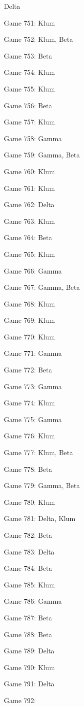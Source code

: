 \documentclass{article}
\begin{document}
\begin{multicols}{3}
\begin{compactitem}
Delta
\item Game 751:
Klum
\item Game 752:
Klum, Beta
\item Game 753:
Beta
\item Game 754:
Klum
\item Game 755:
Klum
\item Game 756:
Beta
\item Game 757:
Klum
\item Game 758:
Gamma
\item Game 759:
Gamma, Beta
\item Game 760:
Klum
\item Game 761:
Klum
\item Game 762:
Delta
\item Game 763:
Klum
\item Game 764:
Beta
\item Game 765:
Klum
\item Game 766:
Gamma
\item Game 767:
Gamma, Beta
\item Game 768:
Klum
\item Game 769:
Klum
\item Game 770:
Klum
\item Game 771:
Gamma
\item Game 772:
Beta
\item Game 773:
Gamma
\item Game 774:
Klum
\item Game 775:
Gamma
\item Game 776:
Klum
\item Game 777:
Klum, Beta
\item Game 778:
Beta
\item Game 779:
Gamma, Beta
\item Game 780:
Klum
\item Game 781:
Delta, Klum
\item Game 782:
Beta
\item Game 783:
Delta
\item Game 784:
Beta
\item Game 785:
Klum
\item Game 786:
Gamma
\item Game 787:
Beta
\item Game 788:
Beta
\item Game 789:
Delta
\item Game 790:
Klum
\item Game 791:
Delta
\item Game 792:

\end{compactitem}
\end{multicols}
\end{document}
